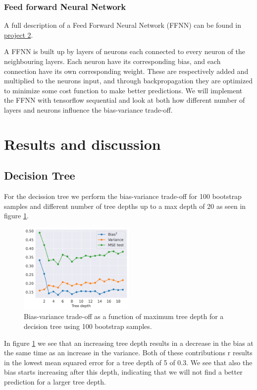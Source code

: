 \documentclass[11pt]{article}
\begin{document}
\subsubsection*{Feed forward Neural Network}
A full description of a Feed Forward Neural Network (FFNN) can be found in \href{https://github.com/Fslippe/FYS-STK4155/blob/main/project2/latex/project2.pdf}{project 2}.


A FFNN is built up by layers of neurons each connected to every neuron of the neighbouring layers. Each neuron have its corresponding bias, and each connection have its own corresponding weight. These are respectively added and multiplied to the neurons input, and through backpropagation they are optimized to minimize some cost function to make better predictions. We will implement the FFNN with tensorflow sequential and look at both how different number of layers and neurons influence the bias-variance trade-off.

\section{Results and discussion}
\subsection*{Decision Tree}
For the decission tree we perform the bias-variance trade-off for 100 bootstrap samples and different number of tree depths up to a max depth of 20 as seen in figure \ref{fig:DT}.
\begin{figure}[H]
    \centering
    \includegraphics[width=0.5\textwidth]{figures/tradeoff_DT.png}
    \caption{Bias-variance trade-off as a function of maximum tree depth for a decision tree using 100 bootstrap samples.}
    \label{fig:DT}
\end{figure}
In figure \ref{fig:DT} we see that an increasing tree depth results in a decrease in the bias at the same time as an increase in the variance. Both of these contributions r results in the lowest mean squared error for a tree depth of 5 of 0.3. We see that also the bias starts increasing after this depth, indicating that we will not find a better prediction for a larger tree depth.
\end{document}
